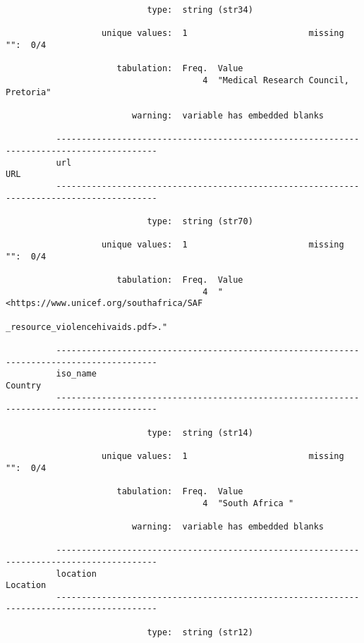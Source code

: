 \documentclass{article}
\begin{document}
\begin{verbatim}
                            type:  string (str34)
          
                   unique values:  1                        missing "":  0/4
          
                      tabulation:  Freq.  Value
                                       4  "Medical Research Council, Pretoria"
          
                         warning:  variable has embedded blanks
          
          ------------------------------------------------------------------------------------------
          url                                                                                    URL
          ------------------------------------------------------------------------------------------
          
                            type:  string (str70)
          
                   unique values:  1                        missing "":  0/4
          
                      tabulation:  Freq.  Value
                                       4  "<https://www.unicef.org/southafrica/SAF
                                          _resource_violencehivaids.pdf>."
          
          ------------------------------------------------------------------------------------------
          iso_name                                                                           Country
          ------------------------------------------------------------------------------------------
          
                            type:  string (str14)
          
                   unique values:  1                        missing "":  0/4
          
                      tabulation:  Freq.  Value
                                       4  "South Africa "
          
                         warning:  variable has embedded blanks
          
          ------------------------------------------------------------------------------------------
          location                                                                          Location
          ------------------------------------------------------------------------------------------
          
                            type:  string (str12)
          

\end{verbatim}
\end{document}
